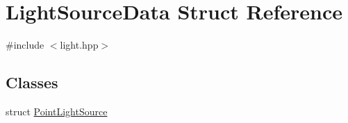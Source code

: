 \hypertarget{struct_light_source_data}{\section{Light\+Source\+Data Struct Reference}
\label{struct_light_source_data}
}


{\ttfamily \#include $<$light.\+hpp$>$}

\subsection*{Classes}
\begin{DoxyCompactItemize}
\item 
struct \hyperlink{struct_light_source_data_1_1_point_light_source}{Point\+Light\+Source}
\end{DoxyCompactItemize}
